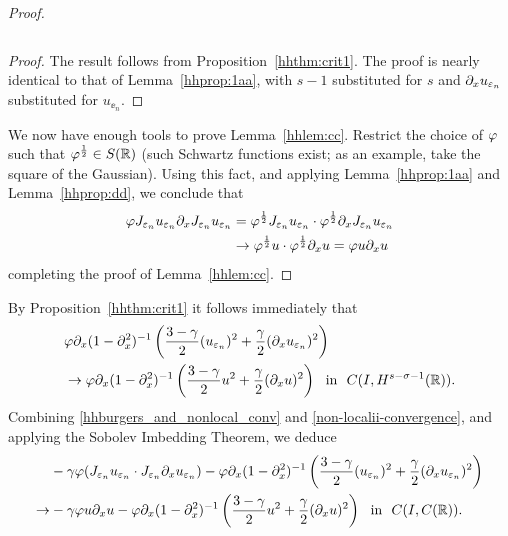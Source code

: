 \begin{proof}
\begin{lemma}
\begin{equation}
\end{equation}
\end{lemma}
\begin{proof} The result follows from Proposition~\ref{hhthm:crit1}.
The proof is nearly identical to that of
Lemma~\ref{hhprop:1aa}, with $s-1$ substituted for $s$
and $\partial_x u_{\varepsilon_n}$ substituted for $u_{\ee_n}$. 
\end{proof}
%
%
We now have enough tools to prove Lemma~\ref{hhlem:cc}. Restrict the
choice of $\varphi$ such that $\varphi^\frac{1}{2} \in S(\mathbb{R})$
(such Schwartz functions exist; as an example, take the square
of the Gaussian). Using this fact, and applying Lemma~\ref{hhprop:1aa} and Lemma~\ref{hhprop:dd}, we conclude that
\begin{equation*}
\begin{split}
\varphi J_{\varepsilon_n} u_{\varepsilon_n} \partial_x J_{\varepsilon_n} u_{\varepsilon_n} 
& = \varphi^\frac{1}{2} J_{\varepsilon_n} u_{\varepsilon_n} \cdot
\varphi^\frac{1}{2} \partial_x J_{\varepsilon_n} u_{\varepsilon_n}
\\
& \to \varphi^\frac{1}{2} u \cdot \varphi^\frac{1}{2} \partial_x u = \varphi
u \partial_x u
\end{split}
\end{equation*}
completing the proof of Lemma~\ref{hhlem:cc}. 
\end{proof}
%
%
%
%
By Proposition~\ref{hhthm:crit1} it follows immediately that
\begin{equation}
\begin{split}
& \varphi \partial_x(1- \partial_x^2)^{-1} \left( \frac{3-\gamma}{2}
(u_{\varepsilon_n})^2
+ \frac{\gamma}{2} (\partial_x u_{\varepsilon_n})^2 \right )
\\
& \to
\varphi \partial_x(1- \partial_x^2)^{-1} \left( \frac{3-\gamma}{2} u^2
+ \frac{\gamma}{2} (\partial_x u)^2 \right ) \ \
\text{in} \ \ C(I, H^{s-\sigma-1}(\mathbb{R})).
\label{non-localii-convergence}
\end{split}
\end{equation}
Combining \eqref{hhburgers_and_nonlocal_conv} and
\eqref{non-localii-convergence}, and applying the Sobolev Imbedding
Theorem, we deduce 
\begin{equation}
\begin{split}
& -\gamma \varphi (J_{\varepsilon_n} u_{\varepsilon_n} \cdot J_{\varepsilon_n} \partial_x
u_{\varepsilon_n}) -
\varphi \partial_x(1- \partial_x^2)^{-1} \left( \frac{3-\gamma}{2}
(u_{\varepsilon_n})^2
+ \frac{\gamma}{2} (\partial_x u_{\varepsilon_n})^2 \right )
\\
\to & -\gamma \varphi u \partial_x u -
\varphi \partial_x(1- \partial_x^2)^{-1} \left( \frac{3-\gamma}{2} u^2
+ \frac{\gamma}{2} (\partial_x u)^2 \right ) \ \
\text{in} \ \ C(I, C(\mathbb{R})).
\label{llloc-non-loc-tog}
\end{split}
\end{equation}
